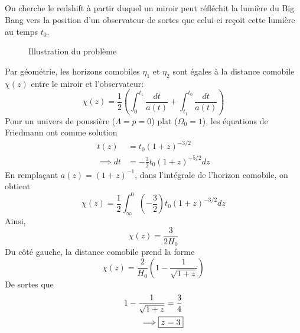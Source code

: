 \documentclass{article}
\numberwithin{equation}{section}
\begin{document}
\subsection{}
On cherche le redshift à partir duquel un miroir peut réfléchit la lumière du Big Bang 
vers la position d'un observateur de sortes que celui-ci reçoit cette lumière au temps 
$t_0$.
\begin{figure}[H]
        \centering
        \caption{Illustration du problème}
        \label{fig:Numero2a}
\end{figure}

Par géométrie, les horizons comobiles $\eta_1$ et $\eta_2$ sont égales à la distance 
comobile $\chi(z)$ entre le miroir et l'observateur:
\[
        \chi(z) = \frac{1}{2} \left( \int_0^{t_1} \frac{dt}{a(t)} 
        + \int_{t_1}^{t_0} \frac{dt}{a(t)}\right)
\]
Pour un univers de poussière ($\Lambda=p=0$) plat ($\Omega_0=1$), les équations de 
Friedmann ont comme solution
\begin{align*}
        t(z) &=  t_0 (1 + z)^{-3/2} \\
        \implies dt &= -\frac{3}{2}t_0 (1 + z)^{-5/2}dz
\end{align*}
En remplaçant $a(z) = (1 + z)^{-1}$, dans l'intégrale de l'horizon comobile, on obtient
\[
        \chi(z) = \frac{1}{2} \int_\infty^{0} \left( - \frac{3}{2} \right)t_0
        (1 + z)^{-3/2} dz
\]
Ainsi,
\[
        \chi(z) = \frac{3}{2H_0}
\]
Du côté gauche, la distance comobile prend la forme
\[
        \chi(z) = \frac{2}{H_0}\left( 1 - \frac{1}{\sqrt{1 + z}} \right)      
\]
De sortes que 
\begin{align*}
        1 - \frac{1}{\sqrt{1 + z}} &=  \frac{3}{4} \\
        \implies \Aboxed{z &= 3} 
\end{align*}
\end{document}
